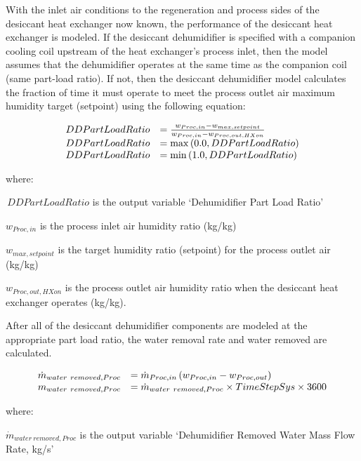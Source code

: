 With the inlet air conditions to the regeneration and process sides of the desiccant heat exchanger now known, the performance of the desiccant heat exchanger is modeled. If the desiccant dehumidifier is specified with a companion cooling coil upstream of the heat exchanger's process inlet, then the model assumes that the dehumidifier operates at the same time as the companion coil (same part-load ratio). If not, then the desiccant dehumidifier model calculates the fraction of time it must operate to meet the process outlet air maximum humidity target (setpoint) using the following equation:

\begin{equation}
  \begin{array}{rl}
    DDPartLoadRatio &= \frac{w_{Proc,in} - w_{max,setpoint}}{w_{Proc,in} - w_{Proc,out,HXon}} \\
    DDPartLoadRatio &= \max\left(0.0,DDPartLoadRatio\right) \\
    DDPartLoadRatio &= \min\left(1.0,DDPartLoadRatio\right)
  \end{array}
\end{equation}

where:

\(\,DDPartLoadRatio\) is the output variable `Dehumidifier Part Load Ratio'

\({w_{Proc,in}}\) is the process inlet air humidity ratio (kg/kg)

\({w_{max,setpoint}}\) is the target humidity ratio (setpoint) for the process outlet air (kg/kg)

\({w_{Proc,out,HXon}}\) is the process outlet air humidity ratio when the desiccant heat exchanger operates (kg/kg).

After all of the desiccant dehumidifier components are modeled at the appropriate part load ratio, the water removal rate and water removed are calculated.

\begin{equation}
  \begin{array}{rl}
    \dot{m}_{water~removed,Proc} & = \dot{m}_{Proc,in} \left(w_{Proc,in} - w_{Proc,out}\right) \\
    m_{water~removed,Proc}       & = \dot{m}_{water~removed,Proc} \times TimeStepSys \times 3600
  \end{array}
\end{equation}

where:

\({\dot{m}_{water~removed,Proc}}\) is the output variable `Dehumidifier Removed Water Mass Flow Rate, kg/s'

